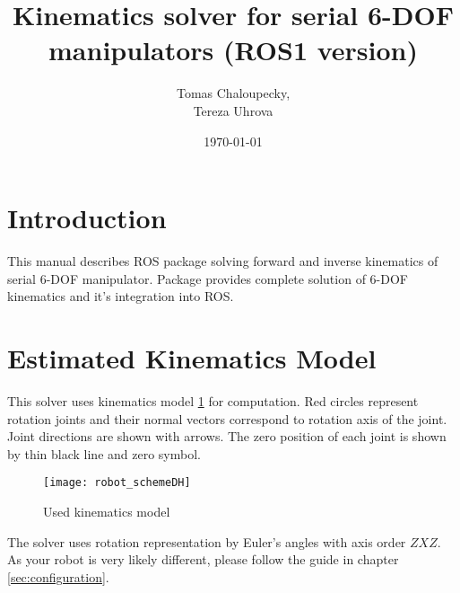 \documentclass[twoside]{article}
\title{Kinematics solver for serial 6-DOF manipulators (ROS1 version)}
\author{Tomas Chaloupecky,\\ Tereza Uhrova}
\date{\today}
\begin{document}
\maketitle
\newpage
\newpage
\section{Introduction}
This manual describes ROS package solving forward and inverse kinematics of serial 6-DOF manipulator.
Package provides complete solution of 6-DOF kinematics and it's integration into ROS. 

\section{Estimated Kinematics Model}
This solver uses kinematics model \ref{fig:robotschemedh} for computation.
Red circles represent rotation joints and their normal vectors correspond to rotation axis of the joint.
Joint directions are shown with arrows. 
The zero position of each joint is shown by thin black line and zero symbol.

\begin{figure}[H]
	\centering
	\texttt{[image: robot\_schemeDH]}
	\caption{Used kinematics model}
	\label{fig:robotschemedh}
\end{figure}

The solver uses rotation representation by Euler's angles with axis order $ ZXZ $.\\
As your robot is very likely different, please follow the guide in chapter \ref{sec:configuration}.

%
\newpage
\end{document}
